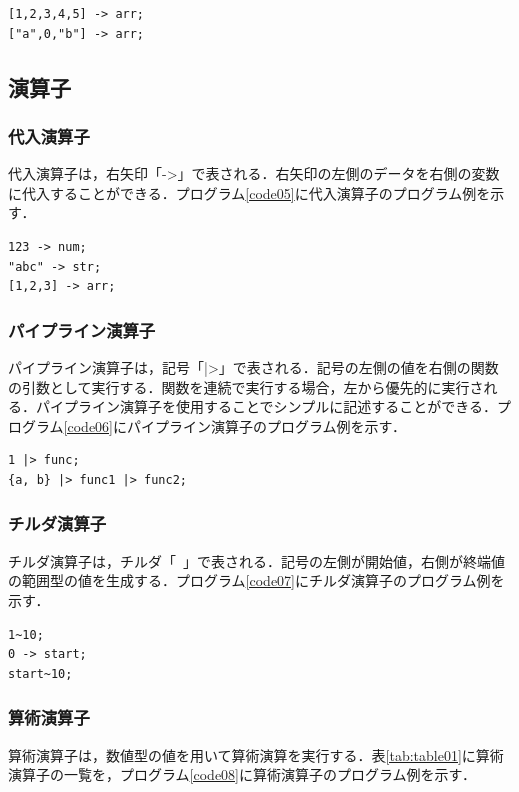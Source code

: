 \documentclass[10pt,a4j]{ltjsarticle}
\begin{document}
\begin{lstlisting}[caption=範囲型のプログラム例, label=code04]
[1,2,3,4,5] -> arr;
["a",0,"b"] -> arr;
\end{lstlisting}

\subsection{演算子}
\subsubsection{代入演算子}
代入演算子は，右矢印「->」で表される．右矢印の左側のデータを右側の変数に代入することができる．プログラム\ref{code05}に代入演算子のプログラム例を示す．

\begin{lstlisting}[caption=代入演算子のプログラム例, label=code05]
123 -> num;
"abc" -> str;
[1,2,3] -> arr;
\end{lstlisting}

\subsubsection{パイプライン演算子}
パイプライン演算子は，記号「|>」で表される．記号の左側の値を右側の関数の引数として実行する．関数を連続で実行する場合，左から優先的に実行される．パイプライン演算子を使用することでシンプルに記述することができる．プログラム\ref{code06}にパイプライン演算子のプログラム例を示す．

\begin{lstlisting}[caption=パイプライン演算子のプログラム例, label=code06]
1 |> func;
{a, b} |> func1 |> func2;
\end{lstlisting}

\subsubsection{チルダ演算子}
チルダ演算子は，チルダ「~」で表される．記号の左側が開始値，右側が終端値の範囲型の値を生成する．プログラム\ref{code07}にチルダ演算子のプログラム例を示す．

\begin{lstlisting}[caption=チルダ演算子のプログラム例, label=code07]
1~10;
0 -> start;
start~10;
\end{lstlisting}

\subsubsection{算術演算子}
算術演算子は，数値型の値を用いて算術演算を実行する．表\ref{tab:table01}に算術演算子の一覧を，プログラム\ref{code08}に算術演算子のプログラム例を示す．
\end{document}
